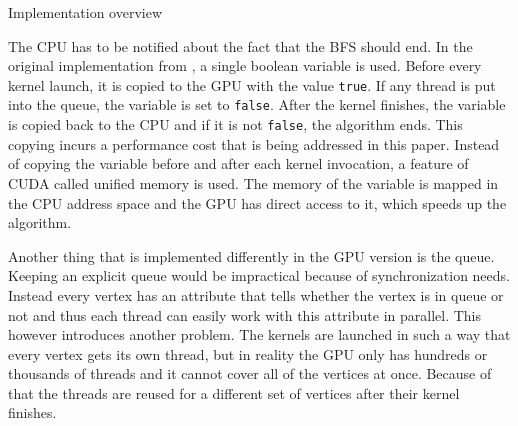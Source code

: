 \documentclass[a4paper,12pt,notitlepage,oneside]{article}
\newcommand{\parspace}[1][]{
	\ifthenelse{\isempty{#1}}{\vspace{5mm}}{\vspace{#1}}
	\par
}
\begin{document}
\begin{section}{Implementation overview}
\parspace The CPU has to be notified about the fact that the BFS should end. In the original implementation from
\cite{CUDAAcceleratedGraph}, a single boolean variable is used. Before every kernel launch, it is copied to the GPU with the value \texttt{true}.
If any thread is put into the queue, the variable is set to \texttt{false}. After the kernel finishes, the variable is copied back to the CPU and if
it is not \texttt{false}, the algorithm ends.
This copying incurs a performance cost that is being addressed in this paper. Instead of copying the variable before and after each kernel invocation, a feature
of CUDA called unified memory is used. The memory of the variable is mapped in the CPU address space and the GPU has direct access to it, which speeds up the
algorithm.

\parspace Another thing that is implemented differently in the GPU version is the queue. Keeping an explicit queue would be impractical because of
synchronization needs. Instead every vertex has an attribute that tells whether the vertex is in queue or not and thus each thread can easily work with
this attribute in parallel.
This however introduces another problem. The kernels are launched in such a way that every vertex gets its own thread, but in reality the GPU only has hundreds
or thousands of threads and it cannot cover all of the vertices at once. Because of that the threads are reused for a different set of vertices after
their kernel finishes.


\end{section}
\end{document}
